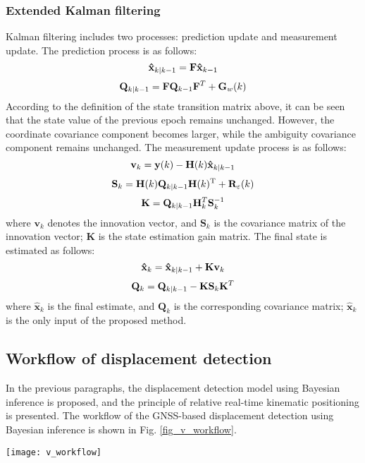 \documentclass[journal]{IEEEtran}
\begin{document}
\subsubsection{Extended Kalman filtering}
Kalman filtering includes two processes: prediction update and measurement update\cite{grewal2001kalman}. The prediction process is as follows:
\begin{equation}
{{\bf{\hat x}}_{k|k - 1}} = {\bf{F}}{{\bf{\hat x}}_{k - 1}}
\end{equation}
\begin{equation}
{{\bf{Q}}_{k|k - 1}} = {\bf{F}}{{\bf{Q}}_{k - 1}}{{\bf{F}}^T} + {{\bf{G}}_w}(k)
\end{equation}
According to the definition of the state transition matrix above, it can be seen that the state value of the previous epoch remains unchanged. However, the coordinate covariance component becomes larger, while the ambiguity covariance component remains unchanged. The measurement update process is as follows:
\begin{equation}
{{\bf{v}}_k} = {\bf{y}}(k) - {\bf{H}}(k){{\bf{\hat x}}_{k|k - 1}}
\end{equation}
\begin{equation}
{{\bf{S}}_k} = {\bf{H}}(k){{\bf{Q}}_{k|k - 1}}{\bf{H}}{(k)^{\rm{T}}} + {{\bf{R}}_\varepsilon }(k)
\end{equation}
\begin{equation}
{\bf{K}} = {{\bf{Q}}_{k|k - 1}}{\bf{H}}_k^T{\bf{S}}_k^{ - 1}
\end{equation}
where ${{\mathbf{v}}_{k}}$ denotes the innovation vector, and ${{\mathbf{S}}_{k}}$ is the covariance matrix of the innovation vector; $\mathbf{K}$ is the state estimation gain matrix. The final state is estimated as follows:
\begin{equation}
{{\bf{\hat x}}_k} = {{\bf{\hat x}}_{k|k - 1}} + {\bf{K}}{{\bf{v}}_k}
\end{equation}
\begin{equation}
{{\bf{Q}}_k} = {{\bf{Q}}_{k|k - 1}} - {\bf{K}}{{\bf{S}}_k}{{\bf{K}}^T}
\end{equation}
where ${{\mathbf{\hat{x}}}_{k}}$ is the final estimate, and ${{\mathbf{Q}}_{k}}$ is the corresponding covariance matrix; ${{\mathbf{\hat{x}}}_{k}}$ is the only input of the proposed method.

\subsection{Workflow of displacement detection }  
In the previous paragraphs, the displacement detection model using Bayesian inference is proposed, and the principle of relative real-time kinematic positioning is presented.
The workflow of the GNSS-based displacement detection using Bayesian inference is shown in Fig. \ref{fig_v_workflow}.
\begin{figure*}[htpb]
	\centering
	\texttt{[image: v\_workflow]}
	\caption{Bayesian model for displacement detection.}
	\label{fig_v_workflow}
\end{figure*} 
\end{document}

